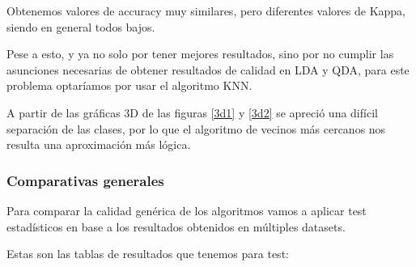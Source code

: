 Obtenemos valores de accuracy muy similares, pero diferentes valores de Kappa, siendo en general todos bajos.

\vspace{\baselineskip}

Pese a esto, y ya no solo por tener mejores resultados, sino por no cumplir las asunciones necesarias de obtener resultados de calidad en LDA y QDA, para este problema optaríamos por usar el algoritmo KNN.

A partir de las gráficas 3D de las figuras \ref{3d1} y \ref{3d2} se apreció una difícil separación de las clases, por lo que el algoritmo de vecinos más cercanos nos resulta una aproximación más lógica.

\newpage

\subsubsection{Comparativas generales}

Para comparar la calidad genérica de los algoritmos vamos a aplicar test estadísticos en base a los resultados obtenidos en múltiples datasets.

\vspace{\baselineskip}

Estas son las tablas de resultados que tenemos para test:

